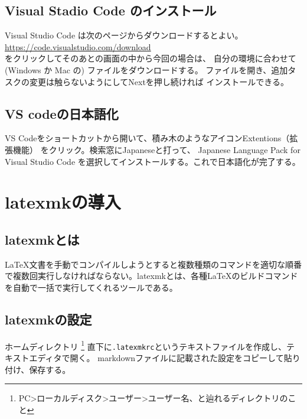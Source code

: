 \documentclass{ltjsarticle}
\begin{document}
\subsection{Visual Stadio Code のインストール}
Visual Studio Code は次のページからダウンロードするとよい。\\
\url{https://code.visualstudio.com/download}\\
をクリックしてそのあとの画面の中から今回の場合は、
自分の環境に合わせて (Windows か Mac の) ファイルをダウンロードする。
ファイルを開き、追加タスクの変更は触らないようにしてNextを押し続ければ
インストールできる。
\subsection{VS codeの日本語化}
VS Codeをショートカットから開いて、積み木のようなアイコンExtentions（拡張機能）
をクリック。検索窓にJapaneseと打って、
Japanese Language Pack for Visual Studio Code
を選択してインストールする。これで日本語化が完了する。

\section{latexmkの導入} 
\subsection{latexmkとは}
\LaTeX 文書を手動でコンパイルしようとすると複数種類のコマンドを適切な順番で複数回実行しなければならない。latexmkとは、各種\LaTeX のビルドコマンドを自動で一括で実行してくれるツールである。

\subsection{latexmkの設定}
ホームディレクトリ
\footnote{
  PC>ローカルディスク>ユーザー>ユーザー名、と辿れるディレクトリのこと
}
直下に\verb|.latexmkrc|というテキストファイルを作成し、テキストエディタで開く。
markdownファイルに記載された設定をコピーして貼り付け、保存する。
\end{document}
